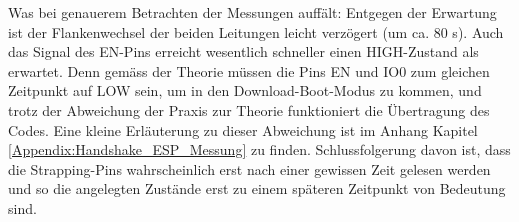 \begin{enumerate}
\begin{enumerate}
Was bei genauerem Betrachten der Messungen auffält: Entgegen der Erwartung ist der Flankenwechsel der beiden Leitungen leicht verzögert (um ca. 80 \textmu s). Auch das Signal des EN-Pins erreicht wesentlich schneller einen HIGH-Zustand als erwartet. Denn gemäss der Theorie müssen die Pins EN und IO0 zum gleichen Zeitpunkt auf LOW sein, um in den Download-Boot-Modus zu kommen, und trotz der Abweichung der Praxis zur Theorie funktioniert die Übertragung des Codes. Eine kleine Erläuterung zu dieser Abweichung ist im Anhang Kapitel \ref{Appendix:Handshake_ESP_Messung} zu finden. Schlussfolgerung davon ist, dass die Strapping-Pins wahrscheinlich erst nach einer gewissen Zeit gelesen werden und so die angelegten Zustände erst zu einem späteren Zeitpunkt von Bedeutung sind.

\end{enumerate}

\end{enumerate}
